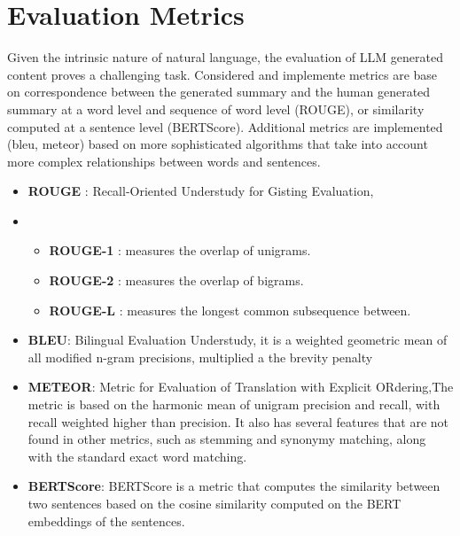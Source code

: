 \documentclass[11pt,a4paper]{article}
\begin{document}
\section{Evaluation Metrics}
Given the intrinsic nature of natural language, the evaluation of LLM generated content proves a challenging task.
Considered and implemente metrics are base on correspondence between the generated summary and the human generated summary
at a word level and sequence of word level (ROUGE), or similarity computed at a sentence level (BERTScore).
Additional metrics are implemented (bleu, meteor) based on more sophisticated algorithms
that take into account more complex relationships between words and sentences.
\begin {itemize}
    \item \textbf{ROUGE} : Recall-Oriented Understudy for Gisting Evaluation,
            \item \begin{itemize}
                \item \textbf{ROUGE-1} : measures the overlap of unigrams.
                \item \textbf{ROUGE-2} : measures the overlap of bigrams.
                \item \textbf{ROUGE-L} : measures the longest common subsequence between.
            \end{itemize}
    \item \textbf{BLEU}: Bilingual Evaluation Understudy,
     it is a weighted geometric mean of all modified n-gram precisions, multiplied a the brevity penalty
    \item \textbf{METEOR}: Metric for Evaluation of Translation with Explicit ORdering,The metric is based on the harmonic mean of unigram precision and recall,
     with recall weighted higher than precision. It also has several features that are not found in other metrics, such as stemming and synonymy matching,
     along with the standard exact word matching.
    \item \textbf{BERTScore}: BERTScore is a metric that computes the similarity between two sentences based on the cosine similarity computed on the BERT embeddings of the sentences.
\end{itemize}
\end{document}
